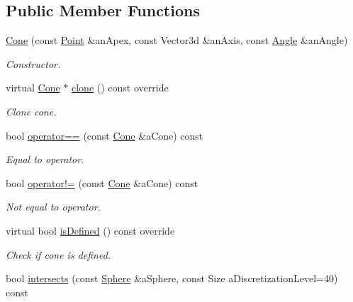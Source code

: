 \subsection*{Public Member Functions}
\begin{DoxyCompactItemize}
\item 
\hyperlink{classostk_1_1math_1_1geom_1_1d3_1_1objects_1_1_cone_ac86773a78cf513900e8b0d3a2709bfcb}{Cone} (const \hyperlink{classostk_1_1math_1_1geom_1_1d3_1_1objects_1_1_point}{Point} \&an\+Apex, const Vector3d \&an\+Axis, const \hyperlink{classostk_1_1math_1_1geom_1_1_angle}{Angle} \&an\+Angle)
\begin{DoxyCompactList}\small\item\em Constructor. \end{DoxyCompactList}\item 
virtual \hyperlink{classostk_1_1math_1_1geom_1_1d3_1_1objects_1_1_cone}{Cone} $\ast$ \hyperlink{classostk_1_1math_1_1geom_1_1d3_1_1objects_1_1_cone_a656d9720f23ab4e04bbb87dc85f9585a}{clone} () const override
\begin{DoxyCompactList}\small\item\em Clone cone. \end{DoxyCompactList}\item 
bool \hyperlink{classostk_1_1math_1_1geom_1_1d3_1_1objects_1_1_cone_a705e91fbd024f12e214030fd3a4ad8a0}{operator==} (const \hyperlink{classostk_1_1math_1_1geom_1_1d3_1_1objects_1_1_cone}{Cone} \&a\+Cone) const
\begin{DoxyCompactList}\small\item\em Equal to operator. \end{DoxyCompactList}\item 
bool \hyperlink{classostk_1_1math_1_1geom_1_1d3_1_1objects_1_1_cone_abdc26e7cac7c112933e7aab3acc1fc55}{operator!=} (const \hyperlink{classostk_1_1math_1_1geom_1_1d3_1_1objects_1_1_cone}{Cone} \&a\+Cone) const
\begin{DoxyCompactList}\small\item\em Not equal to operator. \end{DoxyCompactList}\item 
virtual bool \hyperlink{classostk_1_1math_1_1geom_1_1d3_1_1objects_1_1_cone_a16491ea1637cf69ad002f59bd2b83553}{is\+Defined} () const override
\begin{DoxyCompactList}\small\item\em Check if cone is defined. \end{DoxyCompactList}\item 
bool \hyperlink{classostk_1_1math_1_1geom_1_1d3_1_1objects_1_1_cone_a8d452047780b9b7a4a3c28640f8b82f7}{intersects} (const \hyperlink{classostk_1_1math_1_1geom_1_1d3_1_1objects_1_1_sphere}{Sphere} \&a\+Sphere, const Size a\+Discretization\+Level=40) const

\end{DoxyCompactItemize}
